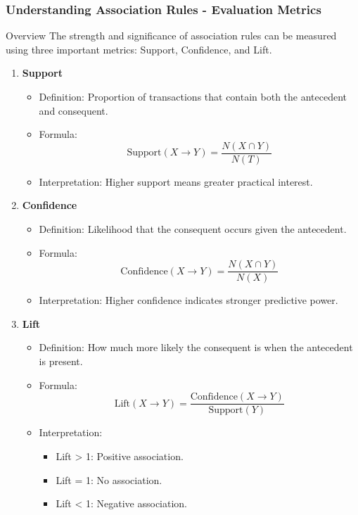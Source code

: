 \documentclass[aspectratio=169]{beamer}
\begin{document}
\begin{frame}[fragile]
    \frametitle{Understanding Association Rules - Evaluation Metrics}
    \begin{block}{Overview}
        The strength and significance of association rules can be measured using three important metrics: Support, Confidence, and Lift.
    \end{block}
    \begin{enumerate}
        \item \textbf{Support}
        \begin{itemize}
            \item Definition: Proportion of transactions that contain both the antecedent and consequent.
            \item Formula: 
            \[
            \text{Support}(X \rightarrow Y) = \frac{N(X \cap Y)}{N(T)}
            \]
            \item Interpretation: Higher support means greater practical interest.
        \end{itemize}

        \item \textbf{Confidence}
        \begin{itemize}
            \item Definition: Likelihood that the consequent occurs given the antecedent.
            \item Formula: 
            \[
            \text{Confidence}(X \rightarrow Y) = \frac{N(X \cap Y)}{N(X)}
            \]
            \item Interpretation: Higher confidence indicates stronger predictive power.
        \end{itemize}

        \item \textbf{Lift}
        \begin{itemize}
            \item Definition: How much more likely the consequent is when the antecedent is present.
            \item Formula: 
            \[
            \text{Lift}(X \rightarrow Y) = \frac{\text{Confidence}(X \rightarrow Y)}{\text{Support}(Y)}
            \]
            \item Interpretation:
            \begin{itemize}
                \item Lift > 1: Positive association.
                \item Lift = 1: No association.
                \item Lift < 1: Negative association.
            \end{itemize}
        \end{itemize}
    \end{enumerate}
\end{frame}
\end{document}
